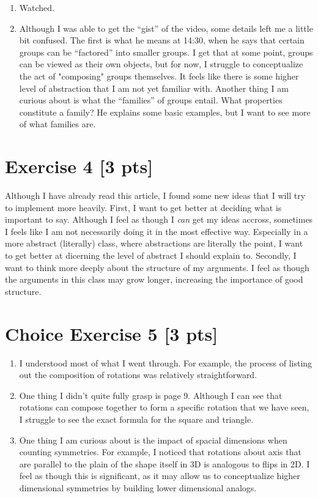 \documentclass{article}
\begin{document}
\begin{enumerate}
    \item {
        Watched.
    }
    \item {
        Although I was able to get the ``gist'' of the video, some details left 
        me a little bit confused. The first is what he means at 14:30, when he 
        says that certain groups can be ``factored'' into smaller groups. I get 
        that at some point, groups can be viewed as their own objects, but for 
        now, I struggle to conceptualize the act of "composing" groups themselves.
        It feels like there is some higher level of abstraction that I am not yet 
        familiar with. Another thing I am curious about is what the ``families''
        of groups entail. What properties constitute a family? He explains some 
        basic examples, but I want to see more of what families are.
    }
\end{enumerate}

\section*{Exercise 4 [3 pts]}

Although I have already read this article, I found some new ideas that I will 
try to implement more heavily. First, I want to get better at deciding what is 
important to say. Although I feel as though I \emph{can} get my ideas accross,
sometimes I feels like I am not necessarily doing it in the most effective way.
Especially in a more abstract (literally) class, where abstractions are literally
the point, I want to get better at dicerning the level of abstract I should 
explain to. Secondly, I want to think more deeply about the structure of my 
arguments. I feel as though the arguments in this class may grow longer, increasing
the importance of good structure.


\section*{Choice Exercise 5 [3 pts]}

\begin{enumerate}
    \item[a.] {
        I understood most of what I went through. For example, the process of 
        listing out the composition of rotations was relatively straightforward.
    }
    \item[b.] {
        One thing I didn't quite fully grasp is page 9. Although I can see that 
        rotations can compose together to form a specific rotation that we have 
        seen, I struggle to see the exact formula for the square and triangle. 
    }
    \item[c.] {
        One thing I am curious about is the impact of spacial dimensions when counting
        symmetries. For example, I noticed that rotations about axis that are 
        parallel to the plain of the shape itself in 3D is analogous to flips 
        in 2D. I feel as though this is significant,
        as it may allow us to conceptualize higher dimensional symmetries by 
        building lower dimensional analogs.
    }
\end{enumerate}
\end{document}
